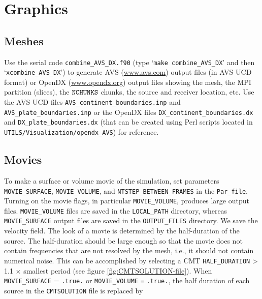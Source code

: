 \documentclass[oneside,english]{book}
\newcommand{\urlwithparentheses}[1]{(\url{#1})}
\newcommand{\nchunks}{\mbox{\texttt{NCHUNKS}}}
\begin{document}


\chapter{\label{cha:graphics}Graphics}


\section{\label{sec:Meshes}Meshes}

Use the serial code \texttt{combine\_AVS\_DX.f90} (type `\texttt{make
combine\_AVS\_DX}' and then `\texttt{xcombine\_AVS\_DX}') to generate
AVS \urlwithparentheses{www.avs.com} output files (in AVS UCD format) or OpenDX \urlwithparentheses{www.opendx.org}
output files showing the mesh, the MPI partition (slices), the $\nchunks$
chunks, the source and receiver location, etc. Use the AVS UCD files
\texttt{AVS\_continent\_boundaries.inp} and \texttt{AVS\_plate\_boundaries.inp}
or the OpenDX files \texttt{DX\_continent\_boundaries.dx} and \texttt{DX\_plate\_boundaries.dx}
(that can be created using Perl scripts located in \texttt{UTILS/Visualization/opendx\_AVS})
for reference.


\section{\label{sec:Movies}Movies}

To make a surface or volume movie of the simulation, set parameters
\texttt{MOVIE\_SURFACE}, \texttt{MOVIE\_VOLUME}, and \texttt{NTSTEP\_BETWEEN\_FRAMES}
in the \texttt{Par\_file}. Turning on the movie flags, in particular
\texttt{MOVIE\_VOLUME}, produces large output files. \texttt{MOVIE\_VOLUME}
files are saved in the \texttt{LOCAL\_PATH} directory, whereas \texttt{MOVIE\_SURFACE}
output files are saved in the \texttt{OUTPUT\_FILES} directory. We
save the velocity field. The look of a movie is determined by the
half-duration of the source. The half-duration should be large enough
so that the movie does not contain frequencies that are not resolved
by the mesh, i.e., it should not contain numerical noise. This can
be accomplished by selecting a CMT \texttt{HALF\_DURATION} > 1.1 $\times$
smallest period (see figure \ref{fig:CMTSOLUTION-file}). When \texttt{\small MOVIE\_SURFACE}
= \texttt{\small .true.} or \texttt{\small MOVIE\_VOLUME}{\small{}
}\texttt{\small =}{\small{} }\texttt{\small .true.}, the half duration
of each source in the \texttt{CMTSOLUTION} file is replaced by
\end{document}
